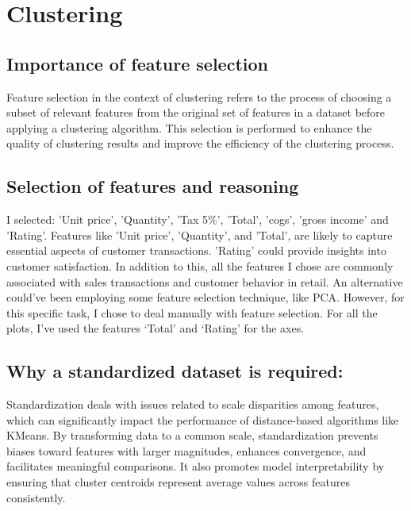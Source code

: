 
\chapter{Clustering} %

\label{Chapter8} %



\section{Importance of feature selection }

 Feature selection in the context of clustering refers to the process of choosing a subset of relevant features from the original set of features in a dataset before applying a clustering algorithm. This selection is performed to enhance the quality of clustering results and improve the efficiency of the clustering process.
 
 \section{Selection of features and reasoning}
 I selected: 'Unit price', 'Quantity', 'Tax 5\%', 'Total', 'cogs', 'gross income' and 'Rating'. 
 \newline 
Features like 'Unit price', 'Quantity', and 'Total', are likely to capture essential aspects of customer transactions. 'Rating' could provide insights into customer satisfaction. In addition to this, all the features I chose are commonly associated with sales transactions and customer behavior in retail. An alternative could’ve been employing some feature selection technique, like PCA. However, for this specific task, I chose to deal manually with feature selection.
\newline 
For all the plots, I’ve used the features ‘Total’ and ‘Rating’ for the axes.


\section{Why a standardized dataset is required:}
Standardization deals with issues related to scale disparities among features, which can significantly impact the performance of distance-based algorithms like KMeans. By transforming data to a common scale, standardization prevents biases toward features with larger magnitudes, enhances convergence, and facilitates meaningful comparisons. It also promotes model interpretability by ensuring that cluster centroids represent average values across features consistently. 

